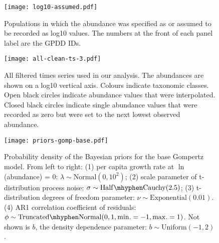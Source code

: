 \renewcommand{\thefigure}{S\arabic{figure}}
\setcounter{figure}{0}

\begin{figure}[htbp]
\begin{center}
\texttt{[image: log10-assumed.pdf]} \caption{Populations in which the abundance was specified as or assumed to be recorded as log10 values. The numbers at the front of each panel label are the GPDD IDs.}
    \label{fig:log10-assumed}
\end{center}
\end{figure}

\begin{figure}[htbp]
\begin{center}
\texttt{[image: all-clean-ts-3.pdf]} \caption{All filtered times series used in our analysis. The abundances are shown on a log10 vertical axis. Colours indicate taxonomic classes. Open black circles indicate abundance values that were interpolated. Closed black circles indicate single abundance values that were recorded as zero but were set to the next lowest observed abundance.}
    \label{fig:all-ts}
\end{center}
\end{figure}

\clearpage

\begin{figure}[htbp]
\begin{center}
\texttt{[image: priors-gomp-base.pdf]} \caption{Probability
  density of the Bayesian priors for the base Gompertz model. From left to right: (1) per capita growth
  rate at $\ln$(abundance) = $0$: $\lambda \sim \mathrm{Normal}(0, 10^2)$; (2) scale
  parameter of t-distribution process noise: $\sigma \sim \mathrm{Half\mhyphen
    Cauchy} (2.5)$; (3) t-distribution degrees of freedom parameter: $\nu \sim
  \mathrm{Exponential}(0.01)$. (4) AR1 correlation coefficient of residuals: $\phi \sim \mathrm{Truncated \mhyphen Normal}(0, 1, \mathrm{min.} = -1, \mathrm{max.} = 1)$. Not shown is $b$, the density dependence
  parameter: $b \sim \mathrm{Uniform}(-1, 2)$.}
  \label{fig:priors}
\end{center}
\end{figure}

\clearpage

